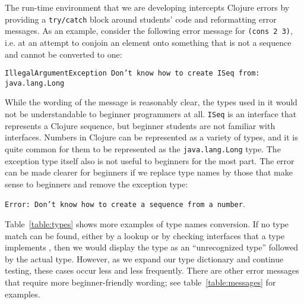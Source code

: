 \documentclass[submission,copyright,creativecommons]{eptcs}
\newcommand{\allcomments}[1]{{#1}}
\newcommand{\elenacomment}[1]{{\bf \textcolor{ForestGreen}{\allcomments{{#1}}}}}
\begin{document}
The run-time environment that we are developing intercepts Clojure errors by providing a {\tt try/catch} block around students' code and reformatting error messages. 
As an example, consider the following error message for {\tt (cons 2 3)}, i.e. at an attempt to conjoin an element onto something that is not a sequence and cannot be converted to one:

{\tt IllegalArgumentException Don't know how to create ISeq from: java.lang.Long}

While the wording of the message is reasonably clear, the types used in it would not be understandable to beginner programmers at all. {\tt ISeq} is an interface that represents a Clojure sequence, but beginner students are not familiar with interfaces. Numbers in Clojure can be represented as a variety of types, and it is quite common for them to be represented as the {\tt  java.lang.Long} type. The exception type itself also is not useful to beginners for the most part. 
The error can be made clearer for beginners if we replace type names by those that make sense to beginners and remove the exception type:

{\tt Error: Don't know how to create a sequence from a number}. 

Table~\ref{table:types} shows more examples of type names conversion. If no type match can be found, either by a lookup or by checking interfaces that a type implements %
, then we would display the type as an ``unrecognized type'' followed by the actual type. However, as we expand our type dictionary and continue testing, these cases occur less and less frequently. 
There are other error messages that require more beginner-friendly wording; see table~\ref{table:messages} for examples. 
\end{document}
